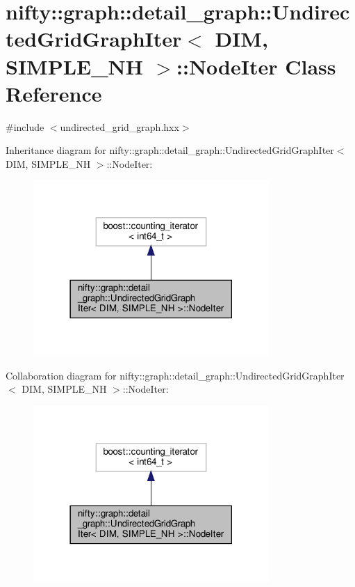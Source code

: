 \hypertarget{classnifty_1_1graph_1_1detail__graph_1_1UndirectedGridGraphIter_1_1NodeIter}{}\section{nifty\+:\+:graph\+:\+:detail\+\_\+graph\+:\+:Undirected\+Grid\+Graph\+Iter$<$ D\+IM, S\+I\+M\+P\+L\+E\+\_\+\+NH $>$\+:\+:Node\+Iter Class Reference}
\label{classnifty_1_1graph_1_1detail__graph_1_1UndirectedGridGraphIter_1_1NodeIter}


{\ttfamily \#include $<$undirected\+\_\+grid\+\_\+graph.\+hxx$>$}



Inheritance diagram for nifty\+:\+:graph\+:\+:detail\+\_\+graph\+:\+:Undirected\+Grid\+Graph\+Iter$<$ D\+IM, S\+I\+M\+P\+L\+E\+\_\+\+NH $>$\+:\+:Node\+Iter\+:
\nopagebreak
\begin{figure}[H]
\begin{center}
\leavevmode
\includegraphics[width=254pt]{classnifty_1_1graph_1_1detail__graph_1_1UndirectedGridGraphIter_1_1NodeIter__inherit__graph}
\end{center}
\end{figure}


Collaboration diagram for nifty\+:\+:graph\+:\+:detail\+\_\+graph\+:\+:Undirected\+Grid\+Graph\+Iter$<$ D\+IM, S\+I\+M\+P\+L\+E\+\_\+\+NH $>$\+:\+:Node\+Iter\+:
\nopagebreak
\begin{figure}[H]
\begin{center}
\leavevmode
\includegraphics[width=254pt]{classnifty_1_1graph_1_1detail__graph_1_1UndirectedGridGraphIter_1_1NodeIter__coll__graph}
\end{center}
\end{figure}


